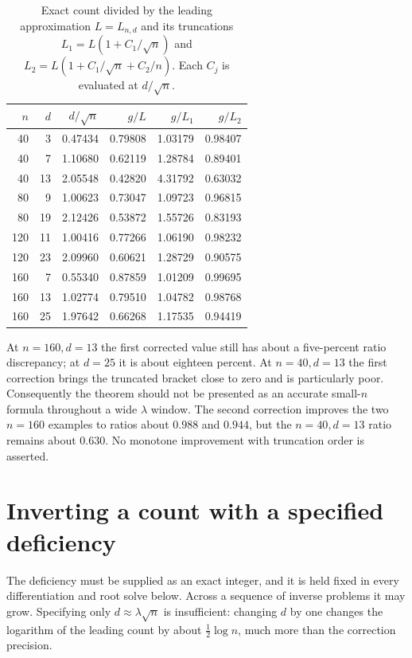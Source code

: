 \documentclass[11pt,letterpaper]{article}
\numberwithin{equation}{section}
\theoremstyle{definition}\newtheorem{definition}[theorem]{Definition}
\theoremstyle{remark}\newtheorem{remark}[theorem]{Remark}
\begin{document}
\begin{table}[H]
\centering
\caption{Exact count divided by the leading approximation $L=L_{n,d}$ and its truncations $L_1=L(1+C_1/\sqrt n)$ and $L_2=L(1+C_1/\sqrt n+C_2/n)$. Each $C_j$ is evaluated at $d/\sqrt n$.}\label{gal:ep:tab:ratios}
\begin{tabular}{@{}rrr rrr@{}}
\toprule
$n$&$d$&$d/\sqrt n$&$g/L$&$g/L_1$&$g/L_2$\\\midrule
40&3&0.47434&0.79808&1.03179&0.98407\\
40&7&1.10680&0.62119&1.28784&0.89401\\
40&13&2.05548&0.42820&4.31792&0.63032\\
80&9&1.00623&0.73047&1.09723&0.96815\\
80&19&2.12426&0.53872&1.55726&0.83193\\
120&11&1.00416&0.77266&1.06190&0.98232\\
120&23&2.09960&0.60621&1.28729&0.90575\\
160&7&0.55340&0.87859&1.01209&0.99695\\
160&13&1.02774&0.79510&1.04782&0.98768\\
160&25&1.97642&0.66268&1.17535&0.94419\\\bottomrule
\end{tabular}
\end{table}
At $n=160,d=13$ the first corrected value still has about a five-percent ratio discrepancy; at $d=25$ it is about eighteen percent. At $n=40,d=13$ the first correction brings the truncated bracket close to zero and is particularly poor. Consequently the theorem should not be presented as an accurate small-$n$ formula throughout a wide $\lambda$ window. The second correction improves the two $n=160$ examples to ratios about $0.988$ and $0.944$, but the $n=40,d=13$ ratio remains about $0.630$. No monotone improvement with truncation order is asserted.

\section{Inverting a count with a specified deficiency}\label{gal:ep:sec:inverse}
The deficiency must be supplied as an exact integer, and it is held fixed in every differentiation and root solve below. Across a sequence of inverse problems it may grow. Specifying only $d\approx\lambda\sqrt n$ is insufficient: changing $d$ by one changes the logarithm of the leading count by about $\tfrac12\log n$, much more than the correction precision.
\end{document}
